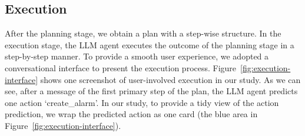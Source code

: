 \subsection{Execution}
\label{sec-method-execution}

After the planning stage, we obtain a plan with a step-wise structure. 
In the execution stage, the LLM agent executes the outcome of the planning stage  in a step-by-step manner. 
To provide a smooth user experience, we adopted a conversational interface to present the execution process. 
Figure~\ref{fig:execution-interface} shows one screenshot of user-involved execution in our study. 
As we can see, after a message of the first primary step of the plan, the LLM agent predicts one action `create\_alarm'. 
In our study, to provide a tidy view of the action prediction, we wrap the predicted action as one card (the blue area in Figure~\ref{fig:execution-interface}). 


